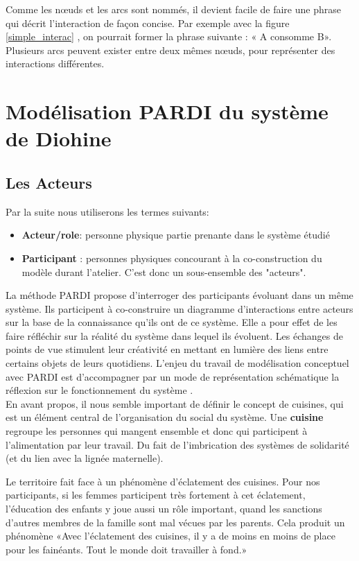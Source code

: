Comme les nœuds et les arcs sont nommés, il devient facile de faire une phrase qui décrit l'interaction de façon concise. Par exemple avec la figure \ref{simple_interac} , on pourrait former la phrase suivante : « A consomme B». Plusieurs arcs peuvent exister entre deux mêmes nœuds, pour représenter des interactions différentes.

\section{Modélisation PARDI du système de Diohine}

\subsection{Les Acteurs}

Par la suite nous utiliserons les termes suivants:
\begin{itemize}
  \item \textbf{Acteur/role}: personne physique partie prenante dans le système étudié
  \item \textbf{Participant} : personnes physiques concourant à la co-construction du modèle durant l'atelier. C'est donc un sous-ensemble des "acteurs".
\end{itemize}

\vspace{0.5cm}

La méthode PARDI propose d'interroger des participants évoluant dans un même système. Ils participent à co-construire un diagramme d'interactions entre acteurs sur la base de la connaissance qu'ils ont de ce système. Elle a pour effet de les faire réfléchir sur la réalité du système dans lequel ils évoluent. Les échanges de points de vue stimulent leur créativité en mettant en lumière des liens entre certains objets de leurs quotidiens. L'enjeu du travail de modélisation conceptuel avec PARDI est d'accompagner par un mode de représentation schématique la réflexion sur le fonctionnement du système \cite{becu_les_2010}.\\

En avant propos, il nous semble important de définir le concept de cuisines, qui est un élément central de l'organisation du social du système. Une \textbf{cuisine} regroupe les personnes qui mangent ensemble et donc qui participent à l’alimentation par leur travail. Du fait de l’imbrication des systèmes de solidarité (et du lien avec la lignée maternelle).

Le territoire fait face à un phénomène d’éclatement des cuisines.  Pour nos participants, si les femmes participent très fortement à cet éclatement, l'éducation des enfants y joue aussi un rôle important, quand les sanctions d'autres membres de la famille sont mal vécues par les parents. Cela produit un phénomène «Avec l’éclatement des cuisines, il y a de moins en moins de place pour les fainéants. Tout le monde doit travailler à fond.»

